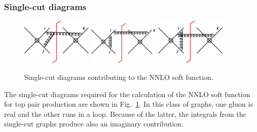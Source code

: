 \documentclass[a4paper,11pt]{article}
\numberwithin{equation}{section}
\begin{document}
\subsubsection*{Single-cut diagrams}

\begin{figure}[t]
  \begin{center}
    \includegraphics[width=0.30\textwidth]{plots/sf-nnlo-real-virtual1.png}
    \hfill
    \includegraphics[width=0.30\textwidth]{plots/sf-nnlo-real-virtual2.png}
    \hfill
    \includegraphics[width=0.30\textwidth]{plots/sf-nnlo-real-virtual3.png}
  \end{center}
  \caption{
  Single-cut diagrams contributing to the NNLO soft function.
  }
  \label{fig:1cutdiagrams}
\end{figure}

The single-cut diagrams required for the calculation of the NNLO soft function
for top pair production are shown in Fig.~\ref{fig:1cutdiagrams}. In this
class of graphs, one gluon is real and the other runs in a loop. Because of the
latter, the integrals from the single-cut graphs produce also an imaginary
contribution.
\end{document}
